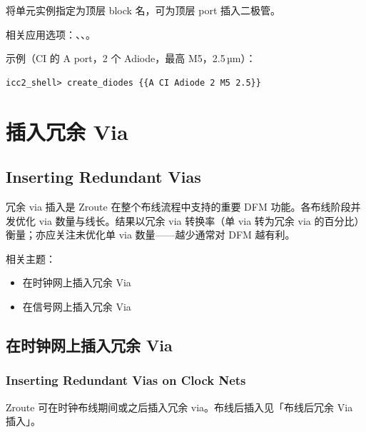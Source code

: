 \begin{noteBox}
将单元实例指定为顶层 block 名，可为顶层 port 插入二极管。
\end{noteBox}

相关应用选项：、、。

示例（CI 的 A port，2 个 Adiode，最高 M5，2.5\,µm）：
\begin{lstlisting}
icc2_shell> create_diodes {{A CI Adiode 2 M5 2.5}}
\end{lstlisting}

\section{插入冗余 Via}
\subsection*{Inserting Redundant Vias}

冗余 via 插入是 Zroute 在整个布线流程中支持的重要 DFM 功能。各布线阶段并发优化 via 数量与线长。结果以冗余 via 转换率（单 via 转为冗余 via 的百分比）衡量；亦应关注未优化单 via 数量——越少通常对 DFM 越有利。

相关主题：
\begin{itemize}
  \item 在时钟网上插入冗余 Via
  \item 在信号网上插入冗余 Via
\end{itemize}

\subsection{在时钟网上插入冗余 Via}
\subsubsection*{Inserting Redundant Vias on Clock Nets}

Zroute 可在时钟布线期间或之后插入冗余 via。布线后插入见「布线后冗余 Via 插入」。

